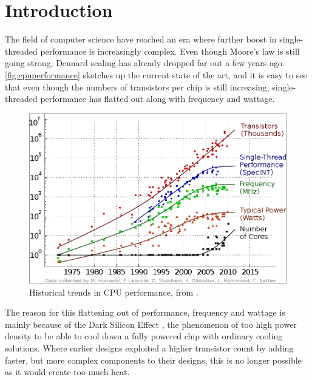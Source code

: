 \chapter{Introduction}

The field of computer science have reached an era where further boost in
single-threaded performance is increasingly complex. Even though Moore's law
\cite{moore1965cramming} is still going strong, Dennard scaling
\cite{dennard1974design} has already dropped far out a few years ago.
\autoref{fig:cpuperformance} sketches up the current state of the art, and it is
easy to see that even though the numbers of transistors per chip is still
increasing, single-threaded performance has flatted out along with frequency and
wattage.

\begin{figure}
    \includegraphics[width=\textwidth]{figs/cpu-performance.png}
    \caption{Historical trends in CPU performance, from \cite{salishan2011}.}
    \label{fig:cpuperformance}
\end{figure}

The reason for this flattening out of performance, frequency and wattage is
mainly because of the Dark Silicon Effect \cite{esmaeilzadeh2011dark}, the
phenomenon of too high power density to be able to cool down a fully powered
chip with ordinary cooling solutions. Where earlier designs exploited a higher
transistor count by adding faster, but more complex components to their designs,
this is no longer possible as it would create too much heat.







